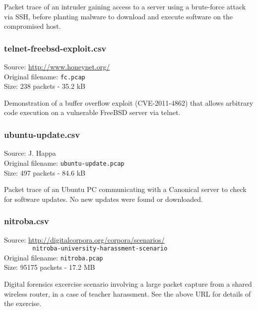 \documentclass[12pt,a4paper]{article}
\begin{document}
	Packet trace of an intruder gaining access to a server
	using a brute-force attack via SSH, before planting malware
	to download and execute software on the compromised host.
	
	\subsubsection*{telnet-freebsd-exploit.csv}
	Source: \url{http://www.honeynet.org/}\\
	Original filename: \verb|fc.pcap|\\
	Size: 238 packets - 35.2 kB

	Demonstration of a buffer overflow exploit (CVE-2011-4862)
	that allows arbitrary code execution on a vulnerable
	FreeBSD server via telnet.
	
	\subsubsection*{ubuntu-update.csv}
	Source: J. Happa\\	
	Original filename: \verb|ubuntu-update.pcap|\\
	Size: 497 packets - 84.6 kB

	Packet trace of an Ubuntu PC communicating with a Canonical
	server to check for software updates. No new updates were
	found or downloaded.
	
	\subsubsection*{nitroba.csv}
	Source: \url{http://digitalcorpora.org/corpora/scenarios/}\\
	\verb!        nitroba-university-harassment-scenario!\\
	Original filename: \verb|nitroba.pcap|\\
	Size: 95175 packets - 17.2 MB

	Digital forensics excercise scenario involving a large
	packet capture from a shared wireless router, in a case of
	teacher harassment. See the above URL for details of the
	exercise.
	
\end{document}
